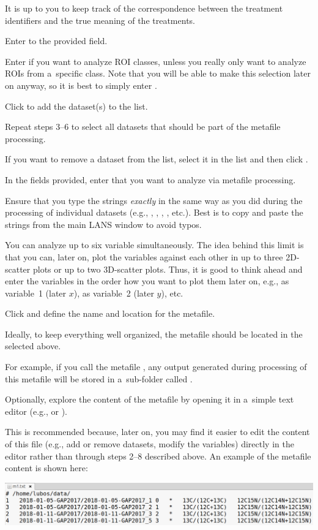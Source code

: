 \bul It is up to you to keep track of the correspondence between the treatment identifiers and the true meaning of the treatments.

\s Enter  to the provided field.

\bul Enter \ttt{*} if you want to analyze  ROI classes, unless you really only want to analyze ROIs from a~specific class. Note that you will be able to make this selection later on anyway, so it is best to simply enter \ttt{*}.

\s Click  to add the dataset(s) to the list. 

\s Repeat steps 3--6 to select all datasets that should be part of the metafile processing.

\bul If you want to remove a dataset from the list, select it in the list and then click .

\s In the fields provided, enter  that you want to analyze via metafile processing. 

\bul Ensure that you type the strings \emph{exactly} in the same way as you did during the processing of individual datasets (e.g., , , , , etc.). Best is to copy and paste the strings from the main LANS window to avoid typos.

\bul You can analyze up to six variable simultaneously. The idea behind this limit is that you can, later on, plot the variables against each other in up to three 2D-scatter plots or up to two 3D-scatter plots. Thus, it is good to think ahead and enter the variables in the order how you want to plot them later on, e.g.,  as variable~1 (later $x$),  as variable~2 (later $y$), etc.

\s Click  and define the name and location for the metafile.

\bul Ideally, to keep everything well organized, the metafile should be located in the  selected above. 

\bul For example, if you call the metafile , any output generated during processing of this metafile will be stored in a~sub-folder called .

\s Optionally, explore the content of the metafile by opening it in a~simple text editor (e.g.,  or ).

\bul This is recommended because, later on, you may find it easier to edit the content of this file (e.g., add or remove datasets, modify the variables) directly in the editor rather than through steps 2--8 described above. An example of the metafile content is shown here:
\begin{center}
\includegraphics[scale=0.35]{figs3/LANS-metafile-m1}
\end{center}


